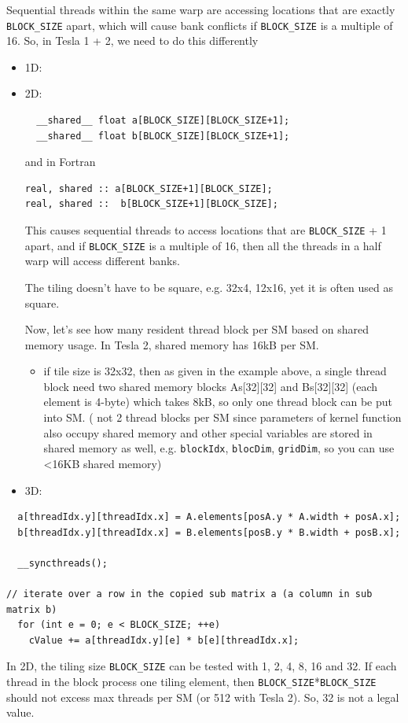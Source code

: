 Sequential threads within the same warp are accessing locations that
are exactly \verb!BLOCK_SIZE! apart, which will cause bank conflicts
if \verb!BLOCK_SIZE! is a multiple of 16. So, in Tesla 1 + 2, we need
to do this differently
\begin{itemize}
\item 1D:

\item 2D:
\begin{lstlisting}
  __shared__ float a[BLOCK_SIZE][BLOCK_SIZE+1];
  __shared__ float b[BLOCK_SIZE][BLOCK_SIZE+1];
\end{lstlisting}
  and in Fortran
\begin{lstlisting}
real, shared :: a[BLOCK_SIZE+1][BLOCK_SIZE];
real, shared ::  b[BLOCK_SIZE+1][BLOCK_SIZE];
\end{lstlisting}
  This causes sequential threads to access locations that are
  \verb!BLOCK_SIZE! + 1 apart, and if \verb!BLOCK_SIZE! is a multiple of
  16, then all the threads in a half warp will access different banks.

  The tiling doesn't have to be square, e.g. 32x4, 12x16, yet it is
  often used as square. 

  Now, let's see how many resident thread block per SM based on shared
  memory usage. In Tesla 2, shared memory has 16kB per SM.
  \begin{itemize}
  \item if tile size is 32x32, then as given in the example above, a
    single thread block need two shared memory blocks As[32][32] and
    Bs[32][32] (each element is 4-byte) which takes 8kB, so only one
    thread block can be put into SM.  ( not 2 thread blocks per SM since
    parameters of kernel function also occupy shared memory and other
    special variables are stored in shared memory as well,
    e.g. \verb!blockIdx!, \verb!blocDim!, \verb!gridDim!, so you can
    use <16KB shared memory)

  \end{itemize}
\item 3D:
\end{itemize}

\begin{lstlisting}
  a[threadIdx.y][threadIdx.x] = A.elements[posA.y * A.width + posA.x];
  b[threadIdx.y][threadIdx.x] = B.elements[posB.y * B.width + posB.x];

  __syncthreads();

// iterate over a row in the copied sub matrix a (a column in sub matrix b)
  for (int e = 0; e < BLOCK_SIZE; ++e)
    cValue += a[threadIdx.y][e] * b[e][threadIdx.x];
\end{lstlisting}
In 2D, the tiling size \verb!BLOCK_SIZE! can be tested with 1, 2, 4,
8, 16 and 32. If each thread in the block process one tiling element,
then \verb!BLOCK_SIZE!*\verb!BLOCK_SIZE! should not excess max threads
per SM (or 512 with Tesla 2). So, 32 is not a legal value. 



